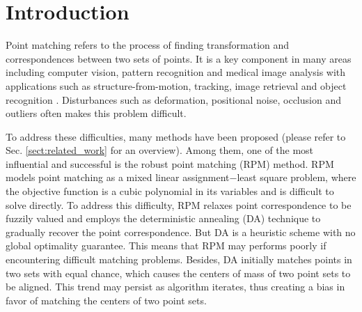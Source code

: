 \documentclass[11pt,bezier,]{article}
\begin{document}
%
\section{Introduction}

Point matching refers to the process  of finding transformation and  correspondences between two sets of points.
It is a key component 
in many areas including 
computer vision, pattern recognition and medical image analysis
with applications such as structure-from-motion, tracking, 
image retrieval and object recognition \cite{book_multiple_view}. 
Disturbances such as deformation, positional noise, occlusion and outliers %
often makes  this problem  difficult. 

To address these difficulties,
many methods have been proposed 
(please refer to Sec. \ref{sect:related_work} for an overview).
Among them,
one of the most influential and successful is the robust point matching (RPM) method.
RPM models point matching as a mixed linear assignment$-$least square problem,
where the objective function is a cubic polynomial in its variables 
and is difficult to solve directly.
To address this difficulty,
RPM relaxes point correspondence to be fuzzily valued 
and employs the deterministic annealing (DA) technique \cite{deterministic_annealing} 
to gradually recover the  point correspondence.
But DA  is a heuristic scheme with no global optimality guarantee.
This means that RPM may performs poorly if encountering difficult matching problems.
Besides, 
DA initially matches points in two sets with equal chance, 
which causes the centers of mass of  two point sets to be aligned.
This trend may persist as algorithm iterates,
thus creating  a bias in favor of  matching the centers of  two point sets.
\end{document}
